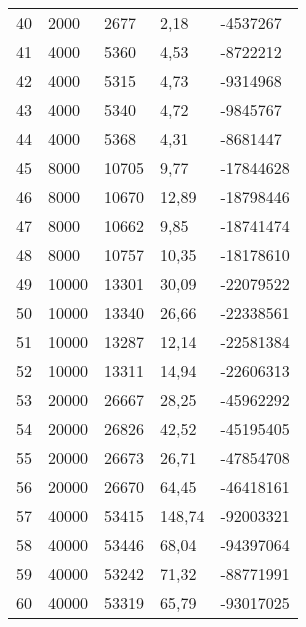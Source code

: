 \begin{longtable}{lllll}
    40               & 2000           & 2677           & 2,18     & -4537267        \\
    41               & 4000           & 5360           & 4,53     & -8722212        \\
    42               & 4000           & 5315           & 4,73     & -9314968        \\
    43               & 4000           & 5340           & 4,72     & -9845767        \\
    44               & 4000           & 5368           & 4,31     & -8681447        \\
    45               & 8000           & 10705          & 9,77     & -17844628       \\
    46               & 8000           & 10670          & 12,89     & -18798446       \\
    47               & 8000           & 10662          & 9,85     & -18741474       \\
    48               & 8000           & 10757          & 10,35     & -18178610       \\
    49               & 10000          & 13301          & 30,09     & -22079522       \\
    50               & 10000          & 13340          & 26,66     & -22338561       \\
    51               & 10000          & 13287          & 12,14     & -22581384       \\
    52               & 10000          & 13311          & 14,94     & -22606313       \\
    53               & 20000          & 26667          & 28,25     & -45962292       \\
    54               & 20000          & 26826          & 42,52     & -45195405       \\
    55               & 20000          & 26673          & 26,71     & -47854708       \\
    56               & 20000          & 26670          & 64,45     & -46418161       \\
    57               & 40000          & 53415          & 148,74     & -92003321       \\
    58               & 40000          & 53446          & 68,04     & -94397064       \\
    59               & 40000          & 53242          & 71,32     & -88771991       \\
    60               & 40000          & 53319          & 65,79     & -93017025       \\

\end{longtable}
